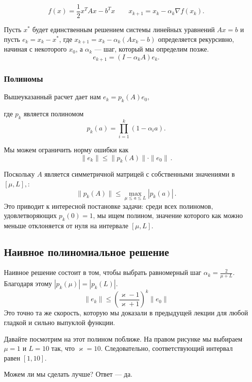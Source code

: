 \documentclass[
  russian,
  letterpaper,
  DIV=11,
  numbers=noendperiod]{scrartcl}
\begin{document}
\[
f(x) = \frac{1}{2} x^T A x - b^T x \qquad x_{k+1} = x_k - \alpha_k \nabla f(x_k).
\]

Пусть \(x^*\) будет единственным решением системы линейных уравнений
\(Ax=b\) и пусть \(e_k = x_k - x^*\), где
\(x_{k+1}=x_k - \alpha_k (Ax_k-b)\) определяется рекурсивно, начиная с
некоторого \(x_0\), а \(\alpha_k\) --- шаг, который мы определим позже.
\[
e_{k+1} = (I-\alpha_k A)e_k.
\]

\subsubsection{Полиномы}\label{ux43fux43eux43bux438ux43dux43eux43cux44b}

Вышеуказанный расчет дает нам \(e_k = p_k(A)e_0,\)

где \(p_k\) является полиномом \[
p_k(a) = \prod_{i=1}^k (1-\alpha_ia).
\]

Мы можем ограничить норму ошибки как \[
\|e_k\|\le \|p_k(A)\|\cdot\|e_0\|\,.
\]

Поскольку \(A\) является симметричной матрицей с собственными значениями
в \([\mu,L],\): \[
\|p_k(A)\|\le \max_{\mu\le a\le L} \left|p_k(a)\right|\,.
\] Это приводит к интересной постановке задачи: среди всех полиномов,
удовлетворяющих \(p_k(0)=1\), мы ищем полином, значение которого как
можно меньше отклоняется от нуля на интервале \([\mu,L]\).

\subsection{Наивное полиномиальное
решение}\label{ux43dux430ux438ux432ux43dux43eux435-ux43fux43eux43bux438ux43dux43eux43cux438ux430ux43bux44cux43dux43eux435-ux440ux435ux448ux435ux43dux438ux435}

Наивное решение состоит в том, чтобы выбрать равномерный шаг
\(\alpha_k=\frac{2}{\mu+L}\). Благодаря этому \(|p_k(\mu)| = |p_k(L)|\).
\[
\|e_k\|\le \left(\frac{\varkappa-1}{\varkappa+1}\right)^k\|e_0\|
\] Это точно та же скорость, которую мы доказали в предыдущей лекции для
любой гладкой и сильно выпуклой функции.

Давайте посмотрим на этот полином поближе. На правом рисунке мы выбираем
\(\mu=1\) и \(L=10\) так, что \(\varkappa=10\). Следовательно,
соответствующий интервал равен \([1,10]\).

Можем ли мы сделать лучше? Ответ --- да.
\end{document}
